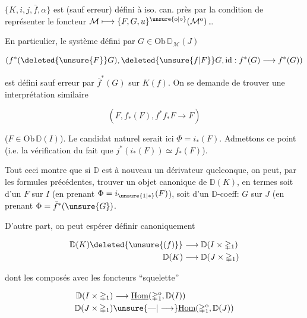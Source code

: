 $\{K,i,j,\bar f,\alpha\}$ est (sauf erreur) défini à iso. can. près par la condition de représenter le foncteur $\mathcal M\longmapsto\{F,G,u\}^{\unsure{\mathrm o|\circ}}(\mathcal M^{\mathrm o})$\ldots

En particulier, le système défini par $G\in\mathrm{Ob}\,\mathbb D_{\mathcal M}(J)$

\[
(f^*(\deleted{\unsure{F}}G),\deleted{\unsure{f|F}}G,\mathrm{id}:f^*(G)\longrightarrow f^*(G))
\]

est défini sauf erreur par $\bar f^*(G)$ sur $K(f)$. On se demande de trouver une interprétation similaire 

\[
(F,f_*(F),f^*f_*F\longrightarrow F)
\]

($F\in\mathrm{Ob}\,\mathbb D(I)$). Le candidat naturel serait ici $\Phi=i_*(F)$. Admettons ce point (i.e.  la vérification du fait que $j^*(i_*(F))\simeq f_*(F)$).

Tout ceci montre que si $\mathbb D$ est à nouveau un dérivateur quelconque, on peut, par les formules précédentes, trouver un objet canonique \inserted{$\Phi$} de $\mathbb D(K)$, en termes soit d'un  $F$ sur $I$ (en prenant $\Phi=i_{\unsure{1|*}}(F)$), soit d'un $\mathbb D$-coeff: $G$ sur $J$ (en prenant $\Phi=\bar f^*(\unsure{G})$.

D'autre part, on peut espérer définir canoniquement

\[
\begin{aligned}
\mathbb D(K)\deleted{\unsure{(f)}}&\longrightarrow\mathbb D(I\times\mathbb{\Delta}_1)\\
\mathbb D(K)&\longrightarrow\mathbb D(J\times\mathbb{\Delta}_1)
\end{aligned}
\]

dont les composés avec les foncteurs ``squelette''

\[
\begin{aligned}
\mathbb D(I\times\mathbb{\Delta}_1)&\longrightarrow\underline{\operatorname{Hom}}(\mathbb{\Delta}_1^{\mathrm o},\mathbb D(I))\\
\mathbb D(J\times\mathbb{\Delta}_1)&\unsure{\text{---}|\longrightarrow}\underline{\operatorname{Hom}}(\mathbb{\Delta}_1^{\mathrm o},\mathbb D(J))
\end{aligned}
\]
